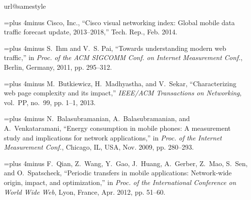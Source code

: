 \documentclass[letterpaper,conference]{IEEEtran}
\begin{document}
%
%
\begin{thebibliography}{10}
\providecommand{\url}[1]{#1}
\csname url@samestyle\endcsname
\providecommand{\newblock}{\relax}
\providecommand{\bibinfo}[2]{#2}
\providecommand{\BIBentrySTDinterwordspacing}{\spaceskip=0pt\relax}
\providecommand{\BIBentryALTinterwordstretchfactor}{4}
\providecommand{\BIBentryALTinterwordspacing}{\spaceskip=\fontdimen2\font plus
\BIBentryALTinterwordstretchfactor\fontdimen3\font minus
  \fontdimen4\font\relax}
\providecommand{\BIBforeignlanguage}[2]{{%
\expandafter\ifx\csname l@#1\endcsname\relax
\typeout{** WARNING: IEEEtran.bst: No hyphenation pattern has been}%
\typeout{** loaded for the language `#1'. Using the pattern for}%
\typeout{** the default language instead.}%
\else
\language=\csname l@#1\endcsname
\fi
#2}}
\providecommand{\BIBdecl}{\relax}
\BIBdecl

\BIBentryALTinterwordspacing
{Cisco, Inc.}, ``Cisco visual networking index: Global mobile data traffic
  forecast update, 2013--2018,'' Tech. Rep., Feb. 2014.
\BIBentrySTDinterwordspacing

\BIBentryALTinterwordspacing
S.~Ihm and V.~S. Pai, ``Towards understanding modern web traffic,'' in
  \emph{Proc. of the ACM SIGCOMM Conf. on Internet Measurement Conf.}, Berlin, Germany, 2011, pp. 295--312. 
\BIBentrySTDinterwordspacing

\BIBentryALTinterwordspacing
M.~Butkiewicz, H.~Madhyastha, and V.~Sekar, ``Characterizing web page
  complexity and its impact,'' \emph{IEEE/ACM Transactions on Networking},
  vol.~PP, no.~99, pp. 1--1, 2013.
\BIBentrySTDinterwordspacing

\BIBentryALTinterwordspacing
N.~Balasubramanian, A.~Balasubramanian, and A.~Venkataramani, ``Energy
  consumption in mobile phones: A measurement study and implications for
  network applications,'' in \emph{Proc. of the Internet Measurement Conf.}, Chicago, IL, USA, Nov. 2009, pp. 280--293. 
\BIBentrySTDinterwordspacing

\BIBentryALTinterwordspacing
F.~Qian, Z.~Wang, Y.~Gao, J.~Huang, A.~Gerber, Z.~Mao, S.~Sen, and
  O.~Spatscheck, ``Periodic transfers in mobile applications: Network-wide
  origin, impact, and optimization,'' in \emph{Proc. of the 
  International Conference on World Wide Web}, Lyon, France, Apr. 2012, pp. 51--60. 
\BIBentrySTDinterwordspacing


\end{thebibliography}
\end{document}
